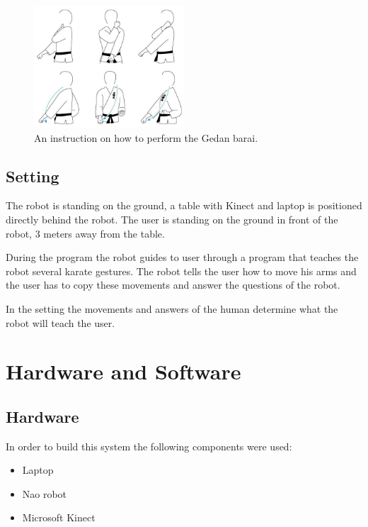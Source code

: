 \documentclass[10pt,a4paper,oneside]{scrartcl}
\begin{document}
\begin{figure}[!ht]
	\centering
	\includegraphics[width=0.5\textwidth]{images/gedanBarai}
	\caption{An instruction on how to perform the Gedan barai.}
	\label{fig:gedanBarai}
\end{figure}

\subsection{Setting}
The robot is standing on the ground, a table with Kinect and laptop is positioned directly behind the robot. 
The user is standing on the ground in front of the robot, 3 meters away from the table. 

During the program the robot guides to user through a program that teaches the robot several karate gestures. The robot tells the user how to move his arms and the user has to copy these movements and answer the questions of the robot. 

In the setting the movements and answers of the human determine what the robot will teach the user. 
\section{Hardware and Software}

\subsection{Hardware}
In order to build this system the following components were used:
\begin{itemize}
  \item Laptop
  \item Nao robot
  \item Microsoft Kinect
\end{itemize}
\end{document}
